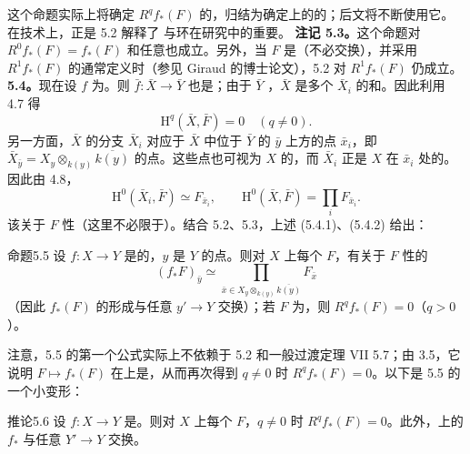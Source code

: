 这个命题实际上将确定 $R^qf_*(F)$ 的，归结为确定上的的；后文将不断使用它。在技术上，正是 5.2 解释了 与环在研究中的重要。
\textbf{注记 5.3。}这个命题对 $R^0f_*(F)=f_*(F)$ 和任意也成立。另外，当 $F$ 是（不必交换），并采用 $R^1f_*(F)$ 的通常定义时（参见 Giraud 的博士论文），5.2 对 $R^1f_*(F)$ 仍成立。
\textbf{5.4。}现在设 $f$ 为。则 $\bar f:\bar X\to\bar Y$ 也是；由于 $\bar Y$ ，$\bar X$ 是多个 $\bar X_i$ 的和。因此利用 4.7 得
\[\mathrm H^q(\bar X,\bar F)=0\quad(q\ne0).\tag{5.4.1}\]
另一方面，$\bar X$ 的分支 $\bar X_i$ 对应于 $\bar X$ 中位于 $\bar Y$ 的 $\bar y$ 上方的点 $\bar x_i$，即 $\bar X_{\bar y}=X_y\otimes_{k(y)}\overline{k(y)}$ 的点。这些点也可视为 $X$ 的，而 $\bar X_i$ 正是 $X$ 在 $\bar x_i$ 处的。因此由 4.8，
\[\mathrm H^0(\bar X_i,\bar F)\simeq F_{\bar x_i},\qquad
\mathrm H^0(\bar X,\bar F)=\prod_iF_{\bar x_i}.\tag{5.4.2}\]
该关于 $F$ 性（这里不必限于）。结合 5.2、5.3，上述 (5.4.1)、(5.4.2) 给出：
\begin{SGAresult}{命题}{5.5}
设 $f:X\to Y$ 是的，$y$ 是 $Y$ 的点。则对 $X$ 上每个 $F$，有关于 $F$ 性的
\[(f_*F)_{\bar y}\simeq\prod_{\bar x\in X_y\otimes_{k(y)}\overline{k(y)}}F_{\bar x}\]
（因此 $f_*(F)$ 的形成与任意 $y'\to Y$ 交换）；若 $F$ 为，则 $R^qf_*(F)=0$（$q>0$）。
\end{SGAresult}
注意，5.5 的第一个公式实际上不依赖于 5.2 和一般过渡定理 VII 5.7；由 3.5，它说明 $F\mapsto f_*(F)$ 在上是，从而再次得到 $q\ne0$ 时 $R^qf_*(F)=0$。以下是 5.5 的一个小变形：
\begin{SGAresult}{推论}{5.6}
设 $f:X\to Y$ 是。则对 $X$ 上每个 $F$，$q\ne0$ 时 $R^qf_*(F)=0$。此外，上的 $f_*$ 与任意 $Y'\to Y$ 交换。
\end{SGAresult}
